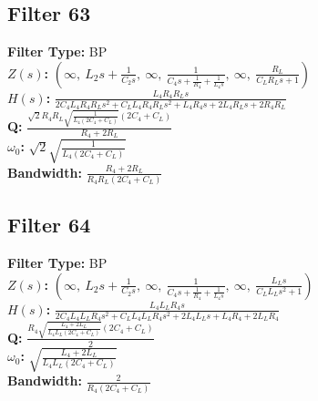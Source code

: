 \documentclass{article}
\begin{document}
\subsection*{Filter 63}
\textbf{Filter Type:} BP \\ 
\textbf{$Z(s)$:} $\left( \infty, \  L_{2} s + \frac{1}{C_{2} s}, \  \infty, \  \frac{1}{C_{4} s + \frac{1}{R_{4}} + \frac{1}{L_{4} s}}, \  \infty, \  \frac{R_{L}}{C_{L} R_{L} s + 1}\right)$ \\ 
\textbf{$H(s)$:} $\frac{L_{4} R_{4} R_{L} s}{2 C_{4} L_{4} R_{4} R_{L} s^{2} + C_{L} L_{4} R_{4} R_{L} s^{2} + L_{4} R_{4} s + 2 L_{4} R_{L} s + 2 R_{4} R_{L}}$ \\ 
\textbf{Q:} $\frac{\sqrt{2} R_{4} R_{L} \sqrt{\frac{1}{L_{4} \left(2 C_{4} + C_{L}\right)}} \left(2 C_{4} + C_{L}\right)}{R_{4} + 2 R_{L}}$ \\ 
\textbf{$\omega_0$:} $\sqrt{2} \sqrt{\frac{1}{L_{4} \left(2 C_{4} + C_{L}\right)}}$ \\ 
\textbf{Bandwidth:} $\frac{R_{4} + 2 R_{L}}{R_{4} R_{L} \left(2 C_{4} + C_{L}\right)}$ \\ 
\subsection*{Filter 64}
\textbf{Filter Type:} BP \\ 
\textbf{$Z(s)$:} $\left( \infty, \  L_{2} s + \frac{1}{C_{2} s}, \  \infty, \  \frac{1}{C_{4} s + \frac{1}{R_{4}} + \frac{1}{L_{4} s}}, \  \infty, \  \frac{L_{L} s}{C_{L} L_{L} s^{2} + 1}\right)$ \\ 
\textbf{$H(s)$:} $\frac{L_{4} L_{L} R_{4} s}{2 C_{4} L_{4} L_{L} R_{4} s^{2} + C_{L} L_{4} L_{L} R_{4} s^{2} + 2 L_{4} L_{L} s + L_{4} R_{4} + 2 L_{L} R_{4}}$ \\ 
\textbf{Q:} $\frac{R_{4} \sqrt{\frac{L_{4} + 2 L_{L}}{L_{4} L_{L} \left(2 C_{4} + C_{L}\right)}} \left(2 C_{4} + C_{L}\right)}{2}$ \\ 
\textbf{$\omega_0$:} $\sqrt{\frac{L_{4} + 2 L_{L}}{L_{4} L_{L} \left(2 C_{4} + C_{L}\right)}}$ \\ 
\textbf{Bandwidth:} $\frac{2}{R_{4} \left(2 C_{4} + C_{L}\right)}$ \\ 
\end{document}
